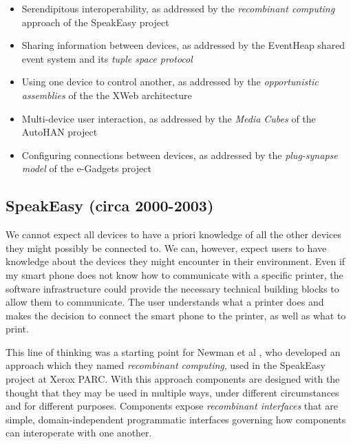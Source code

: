 \begin{itemize}
	\item Serendipitous interoperability, as addressed by the \emph{recombinant computing} approach of the SpeakEasy project
	\item Sharing information between devices, as addressed by the Event\-Heap shared event system and its \emph{tuple space protocol}
	\item Using one device to control another, as addressed by the \emph{opportunistic assemblies} of the the XWeb architecture
	\item Multi-device user interaction, as addressed by the \emph{Media Cubes} of the AutoHAN project
	\item Configuring connections between devices, as addressed by the \emph{plug-synapse model} of the e-Gadgets project
\end{itemize}



\subsection{SpeakEasy (circa 2000-2003)}

We cannot expect all devices to have a priori knowledge of all the other devices they might possibly be connected to. We can, however, expect users to have knowledge about the devices they might encounter in their environment. Even if my smart phone does not know how to communicate with a specific printer, the software infrastructure could provide the necessary technical building blocks to allow them to communicate. The user understands what a printer does and makes the decision to connect the smart phone to the printer, as well as what to print.


This line of thinking was a starting point for Newman et al \cite{Newman2002}, who developed an approach which they named \emph{recombinant computing}, used in the SpeakEasy project at Xerox PARC. With this approach components are designed with the thought that they may be used in multiple ways, under different circumstances and for different purposes. Components expose \emph{recombinant interfaces} that are simple, domain-independent programmatic interfaces governing how components can interoperate with one another.

